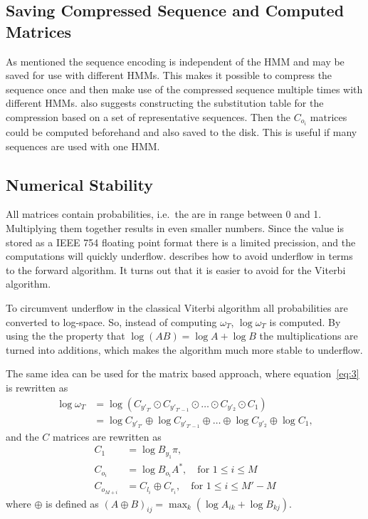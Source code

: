 \subsection{Saving Compressed Sequence and Computed Matrices}
\label{sec:saving-compr-sequ}

As mentioned the sequence encoding is independent of the HMM and may be saved
for use with different HMMs. This makes it possible to compress the sequence
once and then make use of the compressed sequence multiple times with different
HMMs. \citet{lifshits2009speeding} also suggests constructing the substitution
table for the compression based on a set of representative sequences. Then the
$C_{o_i}$ matrices could be computed beforehand and also saved to the
disk. This is useful if many sequences are used with one HMM.\

\subsection{Numerical Stability}

All matrices contain probabilities, i.e.\ the are in range between 0 and
1. Multiplying them together results in even smaller numbers. Since the value
is stored as a IEEE 754 floating point format there is a limited precission,
and the computations will quickly underflow. \citet{sand2013ziphmmlib}
describes how to avoid underflow in terms to the forward algorithm. It turns
out that it is easier to avoid for the Viterbi algorithm.

To circumvent underflow in the classical Viterbi algorithm all probabilities
are converted to log-space. So, instead of computing $\omega_T$,
$\log \omega_T$ is computed. By using the the property that
$\log(AB) = \log A + \log B$ the multiplications are turned into additions,
which makes the algorithm much more stable to underflow.

The same idea can be used for the matrix based approach, where
equation~\eqref{eq:3} is rewritten as
\begin{align*}
  \log \omega_T &= \log \left(C_{y'_{T'}} \odot C_{y'_{T'-1}} \odot \dots \odot
                  C_{y'_2} \odot C_1 \right) \\
                &= \log C_{y'_{T'}} \oplus \log C_{y'_{T'-1}} \oplus \dots \oplus
                  \log C_{y'_2} \oplus \log C_1,
\end{align*}
and the $C$ matrices are rewritten as
\begin{align*}
  C_1 &= \log B_{y_1} \pi, \\
  C_{o_i} &= \log B_{o_i} A^*, \quad \text{for }1 \le i \le M\\
  C_{o_{M + i}} &= C_{l_i} \oplus C_{r_i} , \quad \text{for }1 \le i \le M' - M
\end{align*}
where $\oplus$ is defined as
${ \left( A \oplus B \right)}_{ij} = \max_k \left( \log A_{ik} + \log B_{kj}
\right)$.


